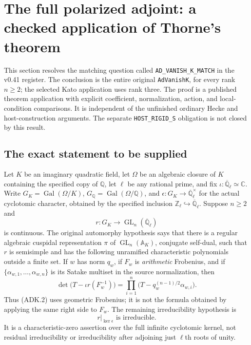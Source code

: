 \section{The full polarized adjoint: a checked application of Thorne's theorem}
\label{sec:adk-match}

This section resolves the matching question called
\texttt{AD\_VANISH\_K\_MATCH} in the v0.41 register.  The conclusion is
the entire original \texttt{AdVanishK}, for every rank $n\ge2$; the
selected Kato application uses rank three.  The proof is a published
theorem application with explicit coefficient, normalization, action,
and local-condition comparisons.  It is independent of the unfinished
ordinary Hecke and host-construction arguments.  The separate
\texttt{HOST\_RIGID\_S} obligation is not closed by this result.

\subsection{The exact statement to be supplied}

Let $K$ be an imaginary quadratic field, let $\Omega$ be an algebraic
closure of $K$ containing the specified copy of $\mathbb Q$, let $\ell$
be any rational prime, and fix
$\iota:\overline{\mathbb Q}_{\ell}\simeq\mathbb C$.
Write $G_K=\operatorname{Gal}(\Omega/K)$,
$G_{\mathbb Q}=\operatorname{Gal}(\Omega/\mathbb Q)$, and
$\epsilon:G_K\to\overline{\mathbb Q}_{\ell}^{\times}$ for the actual
cyclotomic character, obtained by the specified inclusion
$\mathbb Z_\ell\hookrightarrow\overline{\mathbb Q}_\ell$.
Suppose $n\ge2$ and
\[
 r:G_K\longrightarrow\operatorname{GL}_n(\overline{\mathbb Q}_\ell)
 \tag{ADK.1}
\]
is continuous.  The original automorphy hypothesis says that there is
a regular algebraic cuspidal representation $\pi$ of
$\operatorname{GL}_n(\mathbb A_K)$, conjugate self-dual, such that $r$
is semisimple and has the following unramified characteristic
polynomials outside a finite set.  If $w$ has norm $q_w$, if $F_w$ is
\emph{arithmetic} Frobenius, and if
$\{\alpha_{w,1},\ldots,\alpha_{w,n}\}$ is its Satake multiset in the
source normalization, then
\[
 \det\bigl(T-\iota r(F_w^{-1})\bigr)
 =\prod_{i=1}^{n}
   \bigl(T-q_w^{(n-1)/2}\alpha_{w,i}\bigr).
 \tag{ADK.2}
\]
Thus (ADK.2) uses geometric Frobenius; it is not the formula obtained
by applying the same right side to $F_w$.
The remaining irreducibility hypothesis is
\[
                       r|_{\ker\epsilon}\text{ is irreducible}.
 \tag{ADK.3}
\]
It is a characteristic-zero assertion over the full infinite
cyclotomic kernel, not residual irreducibility or irreducibility after
adjoining just $\ell$th roots of unity.

